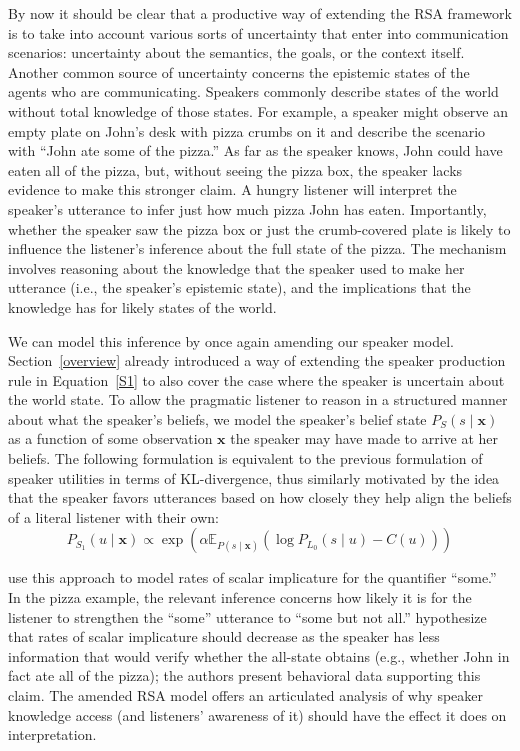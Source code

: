 \documentclass{sp}
\begin{document}
By now it should be clear that a productive way of extending the RSA framework is to take into account various sorts of uncertainty that enter into communication scenarios: uncertainty about the semantics, the goals, or the context itself. Another common source of uncertainty concerns the epistemic states of the agents who are communicating. Speakers commonly describe states of the world without total knowledge of those states. For example, a speaker might observe an empty plate on John's desk with pizza crumbs on it and describe the scenario with ``John ate some of the pizza.'' As far as the speaker knows, John could have eaten all of the pizza, but, without seeing the pizza box, the speaker lacks evidence to make this stronger claim. A hungry listener will interpret the speaker's utterance to infer just how much pizza John has eaten. Importantly, whether the speaker saw the pizza box or just the crumb-covered plate is likely to influence the listener's inference about the full state of the pizza. The mechanism involves reasoning about the knowledge that the speaker used to make her utterance (i.e., the speaker's epistemic state), and the implications that the knowledge has for likely states of the world.

We can model this inference by once again amending our speaker model.
Section~\ref{overview} already introduced a way of extending the speaker production rule in Equation~\eqref{S1} to also cover the case where the speaker is uncertain about the world state.
To allow the pragmatic listener to reason in a structured manner about what the speaker's beliefs, we model the speaker's belief state $P_{S}(s \mid \textbf{x})$ as a function of some observation $\textbf{x}$ the speaker may have made to arrive at her beliefs.
The following formulation is equivalent to the previous formulation of speaker utilities in terms of KL-divergence, thus similarly motivated by the idea that the speaker favors utterances based on how closely they help align the beliefs of a literal listener with their own:
%
\begin{equation} \label{S1-epistemic}
P_{S_1}(u\mid \textbf{x}) \propto \exp (\alpha \mathbb{E}_{P(s\mid \textbf{x})}(\log P_{L_0}(s\mid u) - C(u)))
\end{equation}

\cite{goodmanstuhlmuller2013} use this approach to model rates of scalar implicature for the quantifier ``some.'' In the pizza example, the relevant inference concerns how likely it is for the listener to strengthen the ``some'' utterance to ``some but not all.'' \citeauthor{goodmanstuhlmuller2013} hypothesize that rates of scalar implicature should decrease as the speaker has less information that would verify whether the all-state obtains (e.g., whether John in fact ate all of the pizza); the authors present behavioral data supporting this claim. The amended RSA model offers an articulated analysis of why speaker knowledge access (and listeners' awareness of it) should have the effect it does on interpretation.
\end{document}
